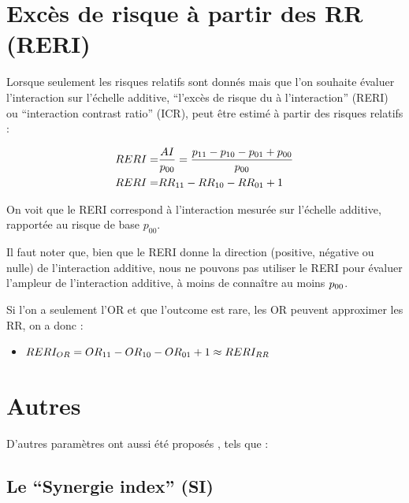 \documentclass[
]{book}
\providecommand{\tightlist}{%
  \setlength{\itemsep}{0pt}\setlength{\parskip}{0pt}}
\begin{document}
\hypertarget{excuxe8s-de-risque-uxe0-partir-des-rr-reri}{%
\section{Excès de risque à partir des RR (RERI)}\label{excuxe8s-de-risque-uxe0-partir-des-rr-reri}}

Lorsque seulement les risques relatifs sont donnés mais que l'on souhaite évaluer l'interaction sur l'échelle additive, ``l'excès de risque du à l'interaction'' (RERI) ou ``interaction contrast ratio'' (ICR), peut être estimé à partir des risques relatifs \citet{vanderweele_tutorial_2014} :

\begin{align*}\small
RERI =& \frac{AI}{p_{00}} = \frac{p_{11} - p_{10} - p_{01} + p_{00}}{p_{00}}\\ 
RERI =& RR_{11} - RR_{10} - RR_{01} + 1
\end{align*}

On voit que le RERI correspond à l'interaction mesurée sur l'échelle additive, rapportée au risque de base \(p_{00}\).

Il faut noter que, bien que le RERI donne la direction (positive, négative ou nulle) de l'interaction additive, nous ne pouvons pas utiliser le RERI pour évaluer l'ampleur de l'interaction additive, à moins de connaître au moins \(\small p_{00}\).

Si l'on a seulement l'OR et que l'outcome est rare, les OR peuvent approximer les RR, on a donc :

\begin{itemize}
\tightlist
\item
  \(\small RERI_{OR} = OR_{11} - OR_{10} - OR_{01} + 1 \approx RERI_{RR}\)
\end{itemize}

\hypertarget{autres}{%
\section{Autres}\label{autres}}

D'autres paramètres ont aussi été proposés \citet{vanderweele_tutorial_2014}, tels que :

\hypertarget{le-synergie-index-si}{%
\subsection*{Le ``Synergie index'' (SI)}\label{le-synergie-index-si}}
\end{document}

